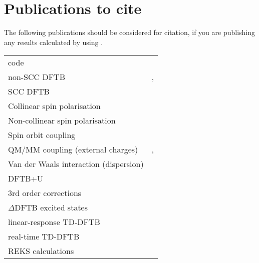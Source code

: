 \chapter{Publications to cite}

The following publications should be considered for citation, if you
are publishing any results calculated by using \dftbp.


\begin{tabular}{lr}
\dftbp{} code & \cite{dftbp-2020paper} \\
non-SCC DFTB & \cite{porezag-PRB-51-12947}, \cite{seifert-ijqc-58-185}
\\
SCC DFTB & \cite{elstner-prb-58-7260} \\
Collinear spin polarisation & \cite{koehler-cp-309-23} \\
Non-collinear spin polarisation & \cite{koehler-JPCA-111-5622} \\
Spin orbit coupling & \cite{koehler-JPCA-111-5622} \\
QM/MM coupling (external charges) & \cite{cui-jpcb-105-569},
\cite{han-ijqc-78-459} \\
Van der Waals interaction (dispersion) & \cite{elstner-jcp-114-5149} \\
DFTB+U & \cite{hourahine07}\\
3rd order corrections & \cite{yang-JPCA-111-10861} \\
$\Delta$DFTB excited states & \cite{irle-JCTC-12-313} \\
linear-response TD-DFTB  & \cite{niehaus-prb-63-085108}\\
real-time TD-DFTB  & \cite{realtime1}\\
REKS calculations & \cite{Lee_JCTC_2019} \\
\end{tabular}



